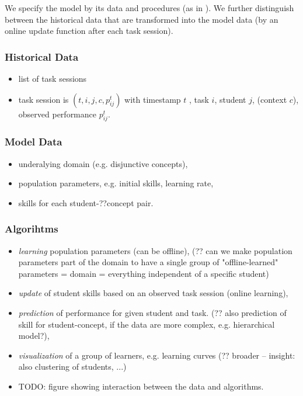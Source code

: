 We specify the model by its data and procedures
(as in \cite{pelanek-learner-modeling}).
We further distinguish between the historical data that are transformed into
the model data (by an online update function after each task session).

\subsubsection{Historical Data}
\begin{itemize}
\item list of task sessions
\item task session is $(t, i, j, c, p^{t}_{ij})$ with
  timestamp $t$ , task $i$, student $j$, (context $c$),
  observed performance $p^{t}_{ij}$.
\end{itemize}

\subsubsection{Model Data}
\begin{itemize}
\item underalying domain (e.g. disjunctive concepts),
\item population parameters, e.g. initial skills, learning rate,
\item skills for each student-??concept pair.
\end{itemize}

\subsubsection{Algorihtms}
\begin{itemize}
\item \emph{learning} population parameters (can be offline),
  (?? can we make population parameters part of the domain to have a single
  group of "offline-learned" parameters = domain = everything independent
  of a specific student)
\item \emph{update} of student skills based on an observed task session
  (online learning),
\item \emph{prediction} of performance for given student and task.
  (?? also prediction of skill for student-concept,
  if the data are more complex, e.g. hierarchical model?),
\item \emph{visualization} of a group of learners, e.g. learning curves
  (?? broader -- insight: also clustering of students, ...)
\item TODO: figure showing interaction between the data and algorithms.
\end{itemize}


